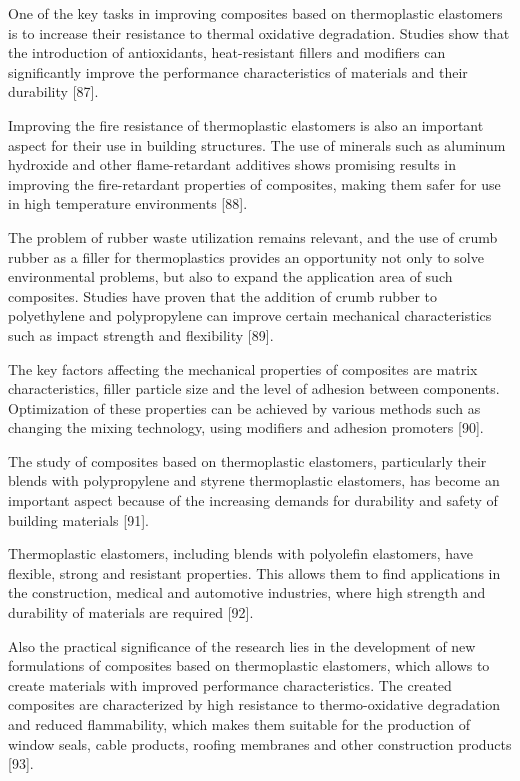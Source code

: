\begin{multicols}{2}
One of the key tasks in improving composites based on thermoplastic
elastomers is to increase their resistance to thermal oxidative
degradation. Studies show that the introduction of antioxidants,
heat-resistant fillers and modifiers can significantly improve the
performance characteristics of materials and their durability {[}87{]}.

Improving the fire resistance of thermoplastic elastomers is also an
important aspect for their use in building structures. The use of
minerals such as aluminum hydroxide and other flame-retardant additives
shows promising results in improving the fire-retardant properties of
composites, making them safer for use in high temperature environments
{[}88{]}.

The problem of rubber waste utilization remains relevant, and the use of
crumb rubber as a filler for thermoplastics provides an opportunity not
only to solve environmental problems, but also to expand the application
area of such composites. Studies have proven that the addition of crumb
rubber to polyethylene and polypropylene can improve certain mechanical
characteristics such as impact strength and flexibility {[}89{]}.

The key factors affecting the mechanical properties of composites are
matrix characteristics, filler particle size and the level of adhesion
between components. Optimization of these properties can be achieved by
various methods such as changing the mixing technology, using modifiers
and adhesion promoters {[}90{]}.

The study of composites based on thermoplastic elastomers, particularly
their blends with polypropylene and styrene thermoplastic elastomers,
has become an important aspect because of the increasing demands for
durability and safety of building materials {[}91{]}.

Thermoplastic elastomers, including blends with polyolefin elastomers,
have flexible, strong and resistant properties. This allows them to find
applications in the construction, medical and automotive industries,
where high strength and durability of materials are required {[}92{]}.

Also the practical significance of the research lies in the development
of new formulations of composites based on thermoplastic elastomers,
which allows to create materials with improved performance
characteristics. The created composites are characterized by high
resistance to thermo-oxidative degradation and reduced flammability,
which makes them suitable for the production of window seals, cable
products, roofing membranes and other construction products {[}93{]}.


\end{multicols}
